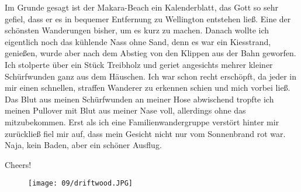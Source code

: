 Im Grunde gesagt ist der Makara-Beach ein Kalenderblatt, das Gott so
sehr gefiel, dass er es in bequemer Entfernung zu Wellington entstehen
ließ. Eine der schönsten Wanderungen bisher, um es kurz zu machen.
Danach wollte ich eigentlich noch das kühlende Nass ohne Sand, denn es
war ein Kiesstrand, genießen, wurde aber nach dem Abstieg von den
Klippen aus der Bahn geworfen. Ich stolperte über ein Stück Treibholz
und geriet angesichts mehrer kleiner Schürfwunden ganz aus dem Häuschen.
Ich war schon recht erschöpft, da jeder in mir einen schnellen, straffen
Wanderer zu erkennen schien und mich vorbei ließ. Das Blut aus meinen
Schürfwunden an meiner Hose abwischend tropfte ich meinen Pullover mit
Blut aus meiner Nase voll, allerdings ohne das mitzubekommen. Erst als
ich eine Familienwandergruppe verstört hinter mir zurückließ fiel mir
auf, dass mein Gesicht nicht nur vom Sonnenbrand rot war. Naja, kein
Baden, aber ein schöner Ausflug.

Cheers!
\begin{figure}[h]
  \centering
  \texttt{[image: 09/driftwood.JPG]}
\end{figure}

